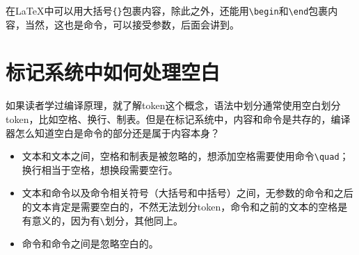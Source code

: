 在LaTeX中可以用大括号\verb|{}|包裹内容，除此之外，还能用\verb|\begin|和\verb|\end|包裹内容，当然，这也是命令，可以接受参数，后面会讲到。

\section{标记系统中如何处理空白}

如果读者学过编译原理，就了解token这个概念，语法中划分通常使用空白划分token，比如空格、换行、制表。但是在标记系统中，内容和命令是共存的，编译器怎么知道空白是命令的部分还是属于内容本身？

\begin{itemize}
    \item 文本和文本之间，空格和制表是被忽略的，想添加空格需要使用命令\verb|\quad|；换行相当于空格，想换段需要空行。
    \item 文本和命令以及命令相关符号（大括号和中括号）之间，无参数的命令和之后的文本肯定是需要空白的，不然无法划分token，命令和之前的文本的空格是有意义的，因为有\verb|\|划分，其他同上。
    \item 命令和命令之间是忽略空白的。
\end{itemize}
